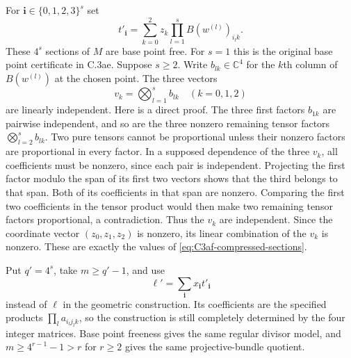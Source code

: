 For $\mathbf i\in\{0,1,2,3\}^s$ set
\begin{equation}\label{eq:C3af-compressed-sections}
             t'_{\mathbf i}
                  =\sum_{k=0}^2 z_k
                        \prod_{l=1}^s B(w^{(l)})_{i_lk}.
\end{equation}
These $4^s$ sections of $M$ are base point free.
For $s=1$ this is the original base point
certificate in C.3ae. Suppose $s\ge2$. Write
$b_{lk}\in\mathbb C^4$ for the $k$th column
of $B(w^{(l)})$ at the chosen point. The three
vectors
\[
                         v_k=\bigotimes_{l=1}^s b_{lk}
                         \quad(k=0,1,2)
\]
are linearly independent. Here is a direct proof.
The three first factors $b_{1k}$ are pairwise
independent, and so are the three nonzero
remaining tensor factors
$\bigotimes_{l=2}^s b_{lk}$. Two pure tensors
cannot be proportional unless their nonzero
factors are proportional in every factor.
In a supposed dependence of the three $v_k$,
all coefficients must be nonzero, since each
pair is independent. Projecting the first
factor modulo the span of its first two
vectors shows that the third belongs to
that span. Both of its coefficients in that
span are nonzero. Comparing the first two
coefficients in the tensor product would
then make two remaining tensor factors
proportional, a contradiction. Thus the
$v_k$ are independent. Since the coordinate
vector $(z_0,z_1,z_2)$ is nonzero, its linear
combination of the $v_k$ is nonzero. These
are exactly the values of
\eqref{eq:C3af-compressed-sections}.

Put $q'=4^s$, take $m\ge q'-1$, and use
\[
                       \ell'=\sum_{\mathbf i}
                                      x_{\mathbf i}t'_{\mathbf i}
\]
instead of $\ell$ in the geometric construction.
Its coefficients are the specified products
$\prod_l a_{i_lj_lk}$, so the construction is
still completely determined by the four
integer matrices. Base point freeness gives
the same regular divisor model, and
$m\ge4^{r-1}-1>r$ for $r\ge2$ gives the
same projective-bundle quotient.

